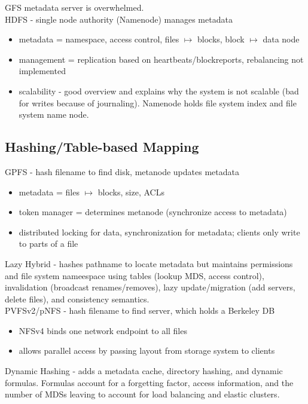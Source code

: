 \documentclass{article}
\begin{document}
\noindent\cite{mckusick:acm2010-gfs-evolution} GFS metadata server is overwhelmed.\\

\noindent\cite{shvachko:login2012-hdfs-scalability} HDFS - single node authority (Namenode) manages metadata
\begin{itemize}
	\item metadata = namespace, access control, files \(\mapsto\) blocks, block \(\mapsto\) data node
	\item management = replication based on heartbeats/blockreports, rebalancing not implemented
	\item scalability - good overview and explains why the system is not scalable (bad for writes because of journaling). Namenode holds file system index and file system name node.
\end{itemize}

\subsection{Hashing/Table-based Mapping}
\noindent\cite{schmuck:fast2002-gpfs} GPFS - hash filename to find disk, metanode updates metadata
\begin{itemize}
	\item metadata = files \(\mapsto\) blocks, size, ACLs
	\item token manager = determines metanode (synchronize access to metadata)
	\item distributed locking for data, synchronization for metadata; clients only write to parts of a file
\end{itemize}

\noindent\cite{brandt:mss2003-lh} Lazy Hybrid - hashes pathname to locate metadata but maintains permissions and file system nameespace using tables (lookup MDS, access control), invalidation (broadcast renames/removes), lazy update/migration (add servers, delete files), and consistency semantics. \\

\noindent\cite{hildebrand:msst2005-pnfs} PVFSv2/pNFS - hash filename to find server, which holds a Berkeley DB
\begin{itemize}
	\item NFSv4 binds one network endpoint to all files
	\item allows parallel access by passing layout from storage system to clients
\end{itemize}

\noindent\cite{li:msst2006-dynamic} Dynamic Hashing - adds a metadata cache, directory hashing, and dynamic formulas. Formulas account for a forgetting factor, access information, and the number of MDSs leaving to account for load balancing and elastic clusters.\\
\end{document}
